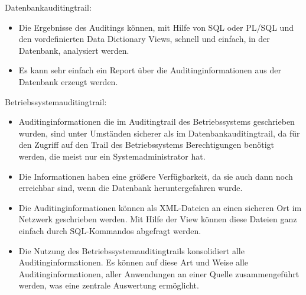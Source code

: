           Datenbankauditingtrail:
          \begin{itemize}
            \item Die Ergebnisse des Auditings k\"onnen, mit Hilfe von SQL oder PL/SQL und den vordefinierten Data Dictionary Views, schnell und einfach, in der Datenbank, analysiert werden.
            \item Es kann sehr einfach ein Report \"uber die Auditinginformationen aus der Datenbank erzeugt werden.
          \end{itemize}
          Betriebssystemauditingtrail:
          \begin{itemize}
            \item Auditinginformationen die im Auditingtrail des Betriebssystems geschrieben wurden, sind unter Umst\"anden sicherer als im Datenbankauditingtrail, da f\"ur den Zugriff auf den Trail des Betriebssystems Berechtigungen ben\"otigt werden, die meist nur ein Systemadministrator hat.
            \item Die Informationen haben eine gr\"o\ss{}ere Verf\"ugbarkeit, da sie auch dann noch erreichbar sind, wenn die Datenbank heruntergefahren wurde.
            \item Die Auditinginformationen k\"onnen als XML-Dateien an einen sicheren Ort im Netzwerk geschrieben werden. Mit Hilfe der View  k\"on\-nen diese Dateien ganz einfach durch SQL-Kommandos abgefragt werden.
            \item Die Nutzung des Betriebssystemauditingtrails konsolidiert alle Auditinginformationen. Es k\"onnen auf diese Art und Weise alle Auditinginformationen, aller Anwendungen an einer Quelle zusammengef\"uhrt werden, was eine zentrale Auswertung  erm\"oglicht.
          \end{itemize}
